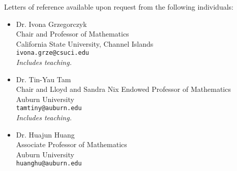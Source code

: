 \documentclass[11pt]{article}
\begin{document}

\makeletterhead

\maketitle

Letters of reference available upon request from the following
individuals:

\begin{itemize}
  \item{} Dr. Ivona Grzegorczyk\\
          Chair and Professor of Mathematics\\
          California State University, Channel Islands\\
          \texttt{ivona.grze@csuci.edu}\\
          \emph{Includes teaching.}
  \item{} Dr. Tin-Yau Tam\\
          Chair and Lloyd and Sandra Nix Endowed
          Professor of Mathematics\\
          Auburn University\\
          \texttt{tamtiny@auburn.edu}\\
          \emph{Includes teaching.}
  \item{} Dr. Huajun Huang\\
          Associate Professor of Mathematics\\
          Auburn University\\
          \texttt{huanghu@auburn.edu}
\end{itemize}

\label{page:last}
\end{document}
